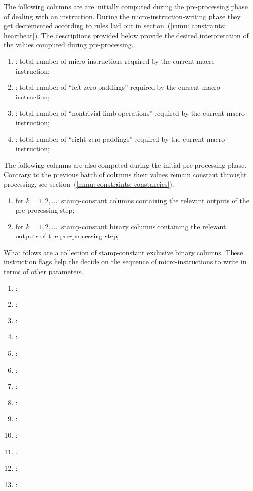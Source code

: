 The following columns are are initially computed during the pre-processing phase of dealing with an \mmuMod{} instruction.
During the micro-instruction-writing phase they get decremented according to rules laid out in section~(\ref{mmu: constraints: heartbeat}).
The descriptions provided below provide the desired interpretation of the values computed during pre-processing. 
\begin{enumerate}[resume]
	\item \ppTot:
		total number of micro-instructions required by the current macro-instruction;	
	\item \ppTotLZ:
		total number of ``left zero paddings'' required by the current macro-instruction;	
	\item \ppTotNT:
		total number of ``nontrivial limb operations'' required by the current macro-instruction;
	\item \ppTotRZ:
		total number of ``right zero paddings'' required by the current macro-instruction;	
\end{enumerate}
The following columns are also computed during the initial pre-processing phase.
Contrary to the previous batch of columns their values remain constant throught processing, see section~(\ref{mmu: constraints: constancies}).
\begin{enumerate}[resume]
	\item {} for $k=1, 2, \dots$:
		stamp-constant columns containing the relevant outputs of the pre-processing step;
	\item {} for $k=1, 2, \dots$:
		stamp-constant binary columns containing the relevant outputs of the pre-processing step;
\end{enumerate}
What folows are a collection of stamp-constant exclusive binary columns.
These instruction flags help the \mmuMod{} decide on the sequence of micro-instructions to write in terms of other parameters. 
\begin{enumerate}[resume]
	\item \mmuInstFlagMload{}:
	\item \mmuInstFlagMstore{}:
	\item \mmuInstFlagMstoreEight{}:
	\item \mmuInstFlagInvalidCodePrefix{}:
	\item \mmuInstFlagRightPaddedWordExtraction{}:
	\item \mmuInstFlagRamToExoWithPadding{}:
	\item \mmuInstFlagExoToRamTransplants{}:
	\item \mmuInstFlagRamToRamSansPadding{}:
	\item \mmuInstFlagAnyToRamWithPaddingSomeData{}:
	\item \mmuInstFlagAnyToRamWithPaddingPurePadding{}:
	\item \mmuInstFlagModexpZero{}:
	\item \mmuInstFlagModexpData{}:
	\item \mmuInstFlagBlake{}:
\end{enumerate}
